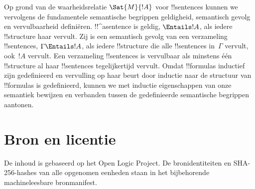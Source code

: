 \documentclass[openany]{memoir}
\begin{document}
Op grond van de waarheidsrelatie $\Sat{M}{!A}$ voor !!{sentence}s
kunnen we vervolgens de fundamentele semantische begrippen geldigheid,
semantisch gevolg en vervulbaarheid definiëren. !!^a{sentence} is
geldig, $\Entails !A$, als iedere !!{structure} haar vervult. Zij is
een semantisch gevolg van een verzameling !!{sentence}s,
$\Gamma \Entails !A$, als iedere !!{structure} die alle !!{sentence}s
in~$\Gamma$ vervult, ook~$!A$ vervult. Een verzameling !!{sentence}s is
vervulbaar als minstens één !!{structure} al haar !!{sentence}s
tegelijkertijd vervult. Omdat !!{formula}s inductief zijn gedefinieerd
en vervulling op haar beurt door inductie naar de structuur van
!!{formula}s is gedefinieerd, kunnen we met inductie eigenschappen van
onze semantiek bewijzen en verbanden tussen de gedefinieerde
semantische begrippen aantonen.
\endgroup
\OLEndChapterHook
\OLEndPartHook

\clearpage
\chapter*{Bron en licentie}
De inhoud is gebaseerd op het Open Logic Project. De bronidentiteiten en
SHA-256-hashes van alle opgenomen eenheden staan in het bijbehorende
machineleesbare bronmanifest.


\end{document}

